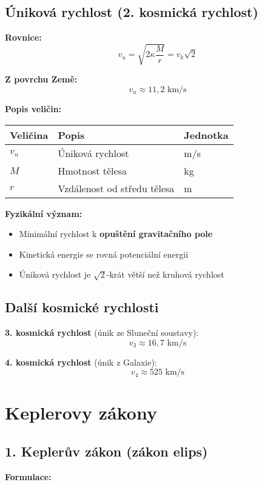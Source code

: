 \documentclass[11pt,a4paper]{article}
\begin{document}
\subsection{Úniková rychlost (2. kosmická rychlost)}

\textbf{Rovnice:}
\[v_u = \sqrt{2\kappa \frac{M}{r}} = v_k\sqrt{2}\]

\textbf{Z povrchu Země:}
\[v_u \approx 11{,}2 \text{ km/s}\]

\textbf{Popis veličin:}

\begin{longtable}{lll}
\toprule
Veličina & Popis & Jednotka \\
\midrule
$v_u$ & Úniková rychlost & m/s \\
$M$ & Hmotnost tělesa & kg \\
$r$ & Vzdálenost od středu tělesa & m \\
\bottomrule
\end{longtable}

\textbf{Fyzikální význam:}

\begin{itemize}
\item Minimální rychlost k \textbf{opuštění gravitačního pole}
\item Kinetická energie se rovná potenciální energii
\item Úniková rychlost je $\sqrt{2}$-krát větší než kruhová rychlost
\end{itemize}

\subsection{Další kosmické rychlosti}

\textbf{3. kosmická rychlost} (únik ze Sluneční soustavy):
\[v_3 \approx 16{,}7 \text{ km/s}\]

\textbf{4. kosmická rychlost} (únik z Galaxie):
\[v_4 \approx 525 \text{ km/s}\]

\clearpage

\section{Keplerovy zákony}

\subsection{1. Keplerův zákon (zákon elips)}

\textbf{Formulace:}
\end{document}
